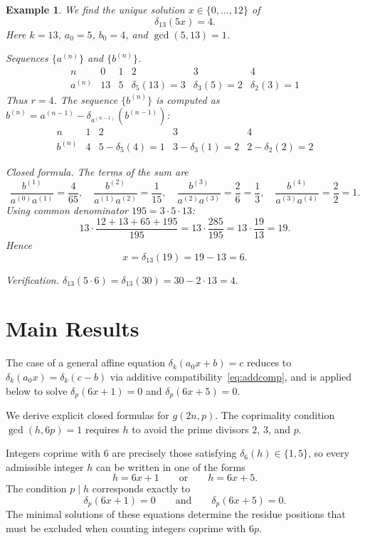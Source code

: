 \documentclass[12pt]{article}
\newtheorem{example}[theorem]{Example}
\begin{document}
\begin{example}\label{ex:minimal}
We find the unique solution $x \in \{0,\dots,12\}$ of
\[
\delta_{13}(5x) = 4.
\]
Here $k = 13$, $a_0 = 5$, $b_0 = 4$, and $\gcd(5,13) = 1$.

\medskip
\textit{Sequences $\{a^{(n)}\}$ and $\{b^{(n)}\}$.}
\[
\begin{array}{c|ccccc}
n       & 0  & 1 & 2               & 3             & 4             \\ \hline
a^{(n)} & 13 & 5 & \delta_5(13)= 3 & \delta_3(5)=2 & \delta_2(3)=1
\end{array}
\]
Thus $r = 4$. The sequence $\{b^{(n)}\}$ is computed as
$b^{(n)} = a^{(n-1)} - \delta_{a^{(n-1)}}(b^{(n-1)})$:
\[
\begin{array}{c|cccc}
n       & 1 & 2                       & 3                     & 4                     \\ \hline
b^{(n)} & 4 & 5 - \delta_5(4) = 1     & 3 - \delta_3(1) = 2   & 2 - \delta_2(2) = 2
\end{array}
\]

\medskip
\textit{Closed formula.}
The terms of the sum are
\[
\frac{b^{(1)}}{a^{(0)}a^{(1)}} = \frac{4}{65},
\quad
\frac{b^{(2)}}{a^{(1)}a^{(2)}} = \frac{1}{15},
\quad
\frac{b^{(3)}}{a^{(2)}a^{(3)}} = \frac{2}{6} = \frac{1}{3},
\quad
\frac{b^{(4)}}{a^{(3)}a^{(4)}} = \frac{2}{2} = 1.
\]
Using common denominator $195 = 3 \cdot 5 \cdot 13$:
\[
13 \cdot \frac{12 + 13 + 65 + 195}{195}
= 13 \cdot \frac{285}{195}
= 13 \cdot \frac{19}{13}
= 19.
\]
Hence
\[
x = \delta_{13}(19) = 19 - 13 = 6.
\]

\medskip
\textit{Verification.}\quad
$\delta_{13}(5 \cdot 6) = \delta_{13}(30) = 30 - 2\cdot 13 = 4.$\quad\checkmark
\end{example}

\section{Main Results}
\label{sec:main}

The case of a general affine equation $\delta_k(a_0 x + b) = c$
reduces to $\delta_k(a_0 x) = \delta_k(c-b)$ via additive
compatibility~\eqref{eq:addcomp}, and is applied below to
solve $\delta_p(6x+1)=0$ and $\delta_p(6x+5)=0$.

We derive explicit closed formulas for $g(2n,p)$. The coprimality
condition $\gcd(h,6p)=1$ requires $h$ to avoid the prime divisors
$2$, $3$, and $p$.

Integers coprime with $6$ are precisely those satisfying
$\delta_6(h) \in \{1,5\}$,
so every admissible integer $h$ can be written in one of the forms
\[
h = 6x+1 \qquad\text{or}\qquad h = 6x+5.
\]
The condition $p \mid h$ corresponds exactly to
\[
\delta_p(6x+1)=0 \qquad\text{and}\qquad \delta_p(6x+5)=0.
\]
The minimal solutions of these equations determine the residue
positions that must be excluded when counting integers coprime with
$6p$.
\end{document}

